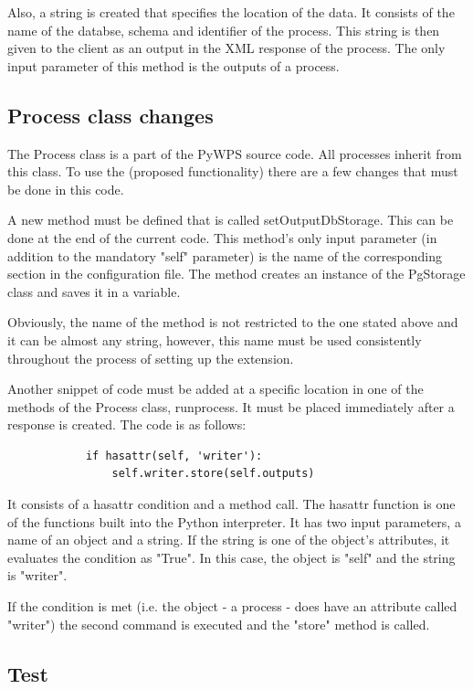 Also, a string is created that specifies the location of the data. It consists of the name of the databse, schema and identifier of the process. This string is then given to the client as an output in the XML response of the process. The only input parameter of this method is the outputs of a process.


\subsection{Process class changes} 

The Process class is a part of the PyWPS source code. All processes inherit from this class. To use the (proposed functionality) there are a few changes that must be done in this code.

A new method must be defined that is called setOutputDbStorage. This can be done at the end of the current code. This method's only input parameter (in addition to the mandatory "self" parameter) is the name of the corresponding section in the configuration file. The method creates an instance of the PgStorage class and saves it in a variable.

Obviously, the name of the method is not restricted to the one stated above and it can be almost any string, however, this name must be used consistently throughout the process of setting up the extension.

Another snippet of code must be added at a specific location in one of the methods of the Process class, \textunderscore run\textunderscore process. It must be placed immediately after a response is created. The code is as follows:
\begin{verbatim}
            if hasattr(self, 'writer'):
                self.writer.store(self.outputs)
\end{verbatim}

It consists of a hasattr condition and a method call. The hasattr function is one of the functions built into the Python interpreter. It has two input parameters, a name of an object and a string. If the string is one of the object's attributes, it evaluates the condition as "True".\cite{hasattr} In this case, the object is "self" and the string is "writer". 

If the condition is met (i.e. the object - a process - does have an attribute called "writer") the second command is executed and the "store" method is called.

\subsection{Test} 


